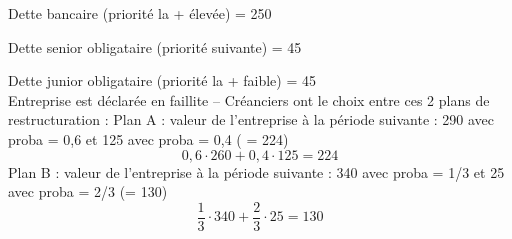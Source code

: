 \documentclass[a4paper, 12pt]{report}
\begin{document}
Dette bancaire (priorité la + élevée) = 250

Dette senior obligataire (priorité suivante) = 45

Dette junior obligataire (priorité la + faible) = 45\\
Entreprise est déclarée en faillite – Créanciers ont le choix entre ces 2 plans de restructuration :
Plan A : valeur de l’entreprise à la période suivante : 290 avec proba = 0,6 et 125 avec proba = 0,4 ( = 224)
$$
0,6 \cdot 260 +0,4\cdot125=224
$$
Plan B : valeur de l’entreprise à la période suivante : 340 avec proba = 1/3 et 25 avec proba = 2/3 (= 130)
$$
\frac{1}{3}\cdot 340 +\frac{2}{3}\cdot25=130
$$
\end{document}
